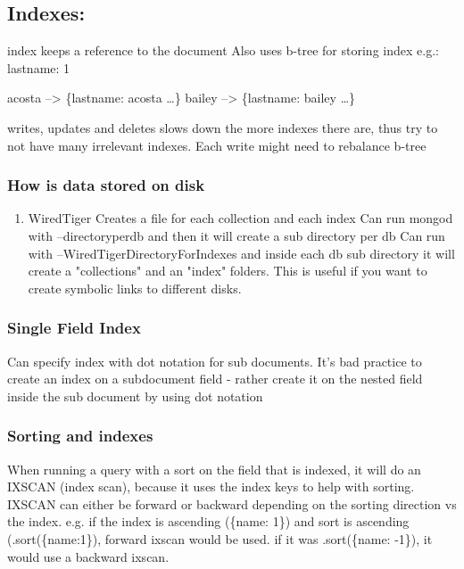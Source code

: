 \documentclass[11pt]{article}
\begin{document}
\subsection{Indexes:}
\label{sec:org2a7a9f4}
index keeps a reference to the document
Also uses b-tree for storing index
e.g.: lastname: 1

acosta --> \{lastname: acosta \ldots{}\}
bailey --> \{lastname: bailey \ldots{}\}

writes, updates and deletes slows down the more indexes there are, thus try to not have many irrelevant indexes. Each write might need to rebalance b-tree

\subsubsection{How is data stored on disk}
\label{sec:org99952be}
\begin{enumerate}
\item WiredTiger
\label{sec:orgf6eb9a6}
Creates a file for each collection and each index
Can run mongod with --directoryperdb and then it will create a sub directory per db
Can run with --WiredTigerDirectoryForIndexes and inside each db sub directory it will create a "collections" and an "index" folders. This is useful if you want to create symbolic links to different disks.
\end{enumerate}

\subsubsection{Single Field Index}
\label{sec:orgfcdbbef}
Can specify index with dot notation for sub documents. It's bad practice to create an index on a subdocument field - rather create it on the nested field inside the sub document by using dot notation

\subsubsection{Sorting and indexes}
\label{sec:org6b046b7}
When running a query with a sort on the field that is indexed, it will do an IXSCAN (index scan), because it uses the index keys to help with sorting. IXSCAN can either be forward or backward depending on the sorting direction vs the index. e.g. if the index is ascending (\{name: 1\}) and sort is ascending (.sort(\{name:1\}), forward ixscan would be used. if it was .sort(\{name: -1\}), it would use a backward ixscan.
\end{document}
